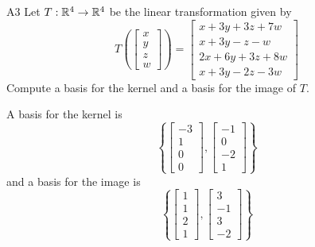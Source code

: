 \begin{problem}{A3}
Let $T: \mathbb{R}^4\rightarrow \mathbb{R}^4$ be the linear transformation given by $$T\left(\begin{bmatrix} x \\ y \\ z \\ w \end{bmatrix} \right) = \begin{bmatrix} x+3y+3z+7w \\ x+3y-z-w \\ 2x+6y+3z+8w \\ x+3y-2z-3w \end{bmatrix}$$
Compute a basis for the kernel and a basis for the image of $T$.
\end{problem}
\begin{solution}
A basis for the kernel is
$$\left\{ \begin{bmatrix} -3 \\ 1 \\ 0 \\ 0 \end{bmatrix} , \begin{bmatrix} -1\\0 \\ -2 \\ 1 \end{bmatrix} \right\}$$
and a basis for the image is
$$\left\{ \begin{bmatrix} 1 \\ 1 \\ 2 \\ 1 \end{bmatrix} , \begin{bmatrix} 3 \\ -1 \\ 3 \\ -2 \end{bmatrix}\right\} $$
\end{solution}



